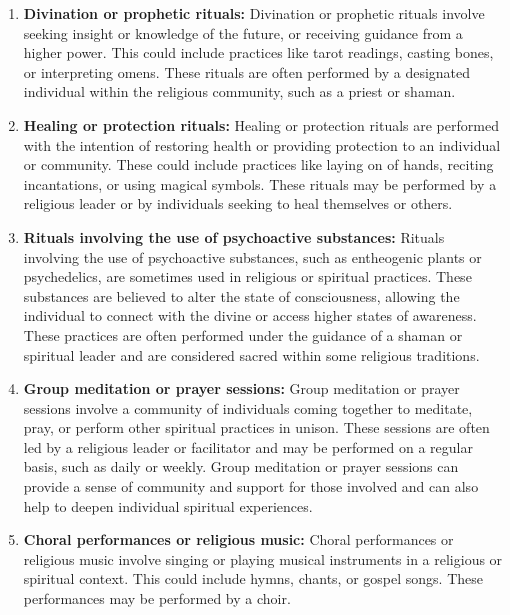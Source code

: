 \documentclass[12pt]{book}
\begin{document}
\begin{enumerate}
    \item \textbf{Divination or prophetic rituals:}
    Divination or prophetic rituals involve seeking insight or knowledge of the future, or receiving guidance from a higher power. This could include practices like tarot readings, casting bones, or interpreting omens. These rituals are often performed by a designated individual within the religious community, such as a priest or shaman.
    
    \item \textbf{Healing or protection rituals:}
    Healing or protection rituals are performed with the intention of restoring health or providing protection to an individual or community. These could include practices like laying on of hands, reciting incantations, or using magical symbols. These rituals may be performed by a religious leader or by individuals seeking to heal themselves or others.

    \item \textbf{Rituals involving the use of psychoactive substances:}
    Rituals involving the use of psychoactive substances, such as entheogenic plants or psychedelics, are sometimes used in religious or spiritual practices. These substances are believed to alter the state of consciousness, allowing the individual to connect with the divine or access higher states of awareness. These practices are often performed under the guidance of a shaman or spiritual leader and are considered sacred within some religious traditions.

    \item \textbf{Group meditation or prayer sessions:}
    Group meditation or prayer sessions involve a community of individuals coming together to meditate, pray, or perform other spiritual practices in unison. These sessions are often led by a religious leader or facilitator and may be performed on a regular basis, such as daily or weekly. Group meditation or prayer sessions can provide a sense of community and support for those involved and can also help to deepen individual spiritual experiences.
    
    \item \textbf{Choral performances or religious music:}
    Choral performances or religious music involve singing or playing musical instruments in a religious or spiritual context. This could include hymns, chants, or gospel songs. These performances may be performed by a choir.
    
\end{enumerate}
\end{document}
